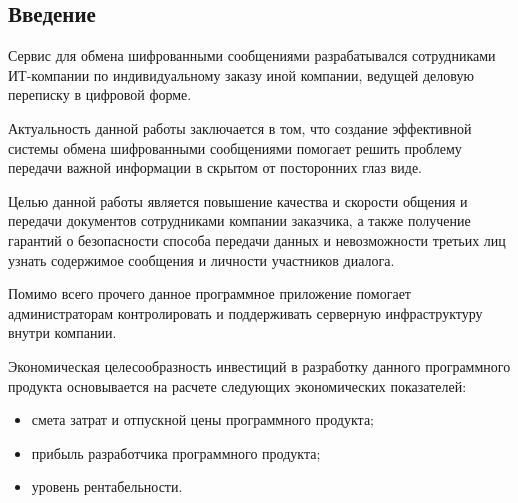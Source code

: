 \subsection{Введение}
\label{sec:economics:intro}

Сервис для обмена шифрованными сообщениями разрабатывался сотрудниками ИТ-компании по индивидуальному заказу иной компании, ведущей деловую переписку в цифровой форме.

Актуальность данной работы заключается в том, что создание эффективной системы обмена шифрованными сообщениями помогает решить проблему передачи важной информации в скрытом от посторонних глаз виде.

Целью данной работы является повышение качества и скорости общения и передачи документов сотрудниками компании заказчика, а также получение гарантий о безопасности способа передачи данных и невозможности третьих лиц узнать содержимое сообщения и личности участников диалога.

Помимо всего прочего данное программное приложение помогает администраторам контролировать и поддерживать серверную инфраструктуру внутри компании.

Экономическая целесообразность инвестиций в разработку данного программного продукта основывается на расчете следующих экономических показателей:
\begin{itemize}
    \item смета затрат и отпускной цены программного продукта;
    \item прибыль разработчика программного продукта;
    \item уровень рентабельности.
\end{itemize}